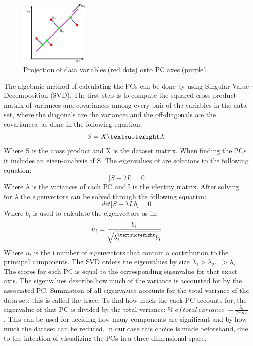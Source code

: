\begin{figure}[H] 
	\includegraphics[width=0.3\textwidth]{figures/zASP/projection}
	\caption{Projection of data variables (red dots) onto PC axes (purple).}
	\label{projection}
\end{figure}
\vspace{-10pt}
The algebraic method of calculating the PCs can be done by using Singular Value Decomposition (SVD). The first step is to compute the squared cross product matrix of variances and covariances among every pair of the variables in the data set, where the diagonals are the variances and the off-diagonals are the covariances, as done in the following equation:
\begin{equation}
S = X \textquoteright X
\end{equation}
Where S is the cross product and X is the dataset matrix. When finding the PCs it includes an eigen-analysis of S. The eigenvalues of are solutions to the following equation:
\begin{equation}
| S - \lambda I |  = 0
\end{equation}
Where $\lambda$ is the variances of each PC and I is the identity matrix. After solving for $\lambda$ the eigenvectors can be solved through the following equation:
\begin{equation}
det | S - \lambda I | b_{i} = 0
\end{equation}
Where $b_{i}$ is used to calculate the eigenvectors as in:
\begin{eqnarray}
u_{i} = \frac{b_{i}}{\sqrt{b_{i}^{\textquoteright} b_{i}}}
\end{eqnarray}
Where $u_{i}$ is the i number of eigenvectors that contain a contribution to the principal components.
The SVD orders the eigenvalues by size $\lambda_{1} > \lambda_{2} … > \lambda_{i}$. The scores for each PC is equal to the corresponding eigenvalue for that exact axis. The eigenvalues describe how much of the variance is accounted for by the associated PC. Summation of all eigenvalues accounts for the total variance of the data set; this is called the trace. To find how much the each PC accounts for, the eigenvalue of that PC is divided by the total variance: $\%~ of~ total~ variance~ = \frac{\lambda_{i}}{Trace}$. This can be used for deciding how many components are significant and by how much the dataset can be reduced. In our case this choice is made beforehand, due to the intention of visualizing the PCs in a three dimensional space. 

